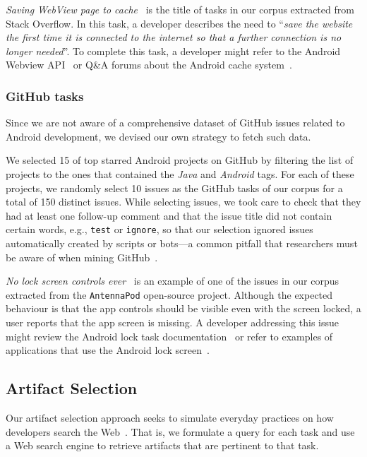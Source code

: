 \textit{Saving WebView page to cache}~\cite{so18607655}
is the title of tasks in our corpus extracted from Stack Overflow. In this task, a developer describes the need
to
``\textit{save the website the first time it is connected to the internet so that a further connection is no longer needed}''.
To complete this task, a developer might refer to the Android Webview API~\cite{apiWebView}
or Q\&A forums about the Android cache system~\cite{so8410830}.


\subsubsection{GitHub tasks}

Since we are not aware of a comprehensive dataset of GitHub issues related to Android development, we devised our own strategy to fetch such data.


We selected 15 of top starred Android projects on GitHub by filtering the list of projects to the ones that contained the \textit{Java} and \textit{Android} tags.
For each of these projects, we randomly select 10 issues as the GitHub tasks of our corpus for a total of 150 distinct issues.
While selecting issues, we took care to check that they had at least one follow-up comment and that the issue title did not contain certain words, e.g., {\small \texttt{test}} or {\small  \texttt{ignore}},
so that our selection ignored issues automatically created by scripts or bots---a common pitfall that researchers must be aware of when mining GitHub~\cite{kalliamvakou2014}.




\textit{No lock screen controls ever}~\cite{git3578}
is an example of one of the issues in our corpus extracted from the \texttt{AntennaPod} open-source project.
Although the expected behaviour is that the app controls should be visible even with the screen locked,  a user reports that the app screen is missing.
A developer addressing this issue might review the Android lock task documentation~\cite{apiLockTask}
or refer to examples of applications that use the Android lock screen~\cite{mediumLockApp}.





\subsection{Artifact Selection}
\label{cp4:corpus-artifacts}


Our artifact selection approach seeks to simulate everyday practices on how developers search the Web~\cite{rao2020, Xia2017}. That is, we formulate a query for each task and use a Web search engine to retrieve artifacts that are pertinent to that task.


